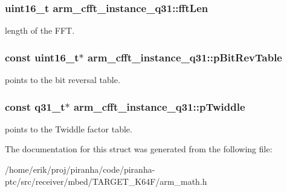 \subsubsection[{\texorpdfstring{fft\+Len}{fftLen}}]{\setlength{\rightskip}{0pt plus 5cm}uint16\+\_\+t arm\+\_\+cfft\+\_\+instance\+\_\+q31\+::fft\+Len}\hypertarget{structarm__cfft__instance__q31_a4406f23e8fd0bff8d555225612e2a2a8}{}\label{structarm__cfft__instance__q31_a4406f23e8fd0bff8d555225612e2a2a8}
length of the F\+FT. 
\subsubsection[{\texorpdfstring{p\+Bit\+Rev\+Table}{pBitRevTable}}]{\setlength{\rightskip}{0pt plus 5cm}const uint16\+\_\+t$\ast$ arm\+\_\+cfft\+\_\+instance\+\_\+q31\+::p\+Bit\+Rev\+Table}\hypertarget{structarm__cfft__instance__q31_a8a464461649f023325ced1e10470f5d0}{}\label{structarm__cfft__instance__q31_a8a464461649f023325ced1e10470f5d0}
points to the bit reversal table. 
\subsubsection[{\texorpdfstring{p\+Twiddle}{pTwiddle}}]{\setlength{\rightskip}{0pt plus 5cm}const q31\+\_\+t$\ast$ arm\+\_\+cfft\+\_\+instance\+\_\+q31\+::p\+Twiddle}\hypertarget{structarm__cfft__instance__q31_af751114feb91de3ace8600e91bdd0872}{}\label{structarm__cfft__instance__q31_af751114feb91de3ace8600e91bdd0872}
points to the Twiddle factor table. 

The documentation for this struct was generated from the following file\+:\begin{DoxyCompactItemize}
\item 
/home/erik/proj/piranha/code/piranha-\/ptc/src/receiver/mbed/\+T\+A\+R\+G\+E\+T\+\_\+\+K64\+F/arm\+\_\+math.\+h\end{DoxyCompactItemize}
